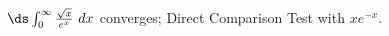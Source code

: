 {$\ds \int_{0}^\infty \frac{\sqrt{x}}{e^x} \ dx$}
{converges; Direct Comparison Test with $xe^{-x}$.}
